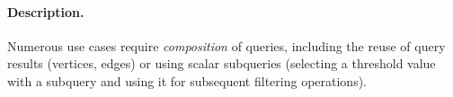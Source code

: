 
\paragraph{Description.}

Numerous use cases require \emph{composition} of queries, including the reuse of
query results (\eg vertices, edges) or using scalar subqueries (\eg selecting a
threshold value with a subquery and using it for subsequent filtering
operations).


